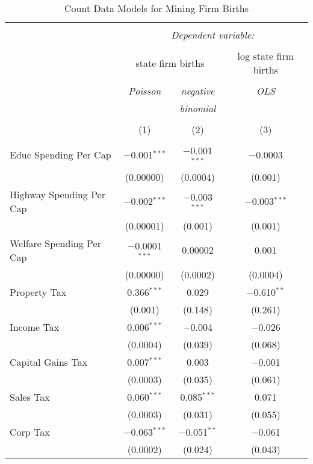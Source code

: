 
\begin{table}[!htbp] \centering 
  \caption{Count Data Models for Mining Firm Births} 
  \label{} 
\begin{tabular}{@{\extracolsep{5pt}}lccc} 
\\[-1.8ex]\hline 
\hline \\[-1.8ex] 
 & \multicolumn{3}{c}{\textit{Dependent variable:}} \\ 
\cline{2-4} 
\\[-1.8ex] & \multicolumn{2}{c}{state firm births} & log state firm births \\ 
\\[-1.8ex] & \textit{Poisson} & \textit{negative} & \textit{OLS} \\ 
 & \textit{} & \textit{binomial} & \textit{} \\ 
\\[-1.8ex] & (1) & (2) & (3)\\ 
\hline \\[-1.8ex] 
 Educ Spending Per Cap & $-$0.001$^{***}$ & $-$0.001$^{***}$ & $-$0.0003 \\ 
  & (0.00000) & (0.0004) & (0.001) \\ 
  Highway Spending Per Cap  & $-$0.002$^{***}$ & $-$0.003$^{***}$ & $-$0.003$^{***}$ \\ 
  & (0.00001) & (0.001) & (0.001) \\ 
  Welfare Spending Per Cap  & $-$0.0001$^{***}$ & 0.00002 & 0.001 \\ 
  & (0.00000) & (0.0002) & (0.0004) \\ 
  Property Tax & 0.366$^{***}$ & 0.029 & $-$0.610$^{**}$ \\ 
  & (0.001) & (0.148) & (0.261) \\ 
  Income Tax & 0.006$^{***}$ & $-$0.004 & $-$0.026 \\ 
  & (0.0004) & (0.039) & (0.068) \\ 
  Capital Gains Tax & 0.007$^{***}$ & 0.003 & $-$0.001 \\ 
  & (0.0003) & (0.035) & (0.061) \\ 
  Sales Tax & 0.060$^{***}$ & 0.085$^{***}$ & 0.071 \\ 
  & (0.0003) & (0.031) & (0.055) \\ 
  Corp Tax & $-$0.063$^{***}$ & $-$0.051$^{**}$ & $-$0.061 \\ 
  & (0.0002) & (0.024) & (0.043) \\ 

\end{tabular}
\end{table}
